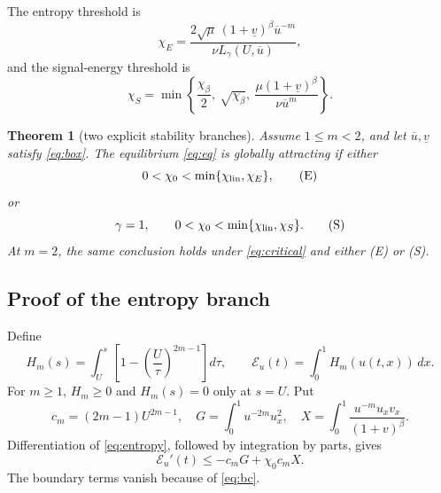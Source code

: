 \documentclass[11pt]{article}
\newtheorem{theorem}{Theorem}
\begin{document}
The entropy threshold is
\begin{equation}
 \chi_E=
 \frac{2\sqrt\mu\,(1+\underline v)^\beta\overline u^{-m}}
 {\nu L_\gamma(U,\overline u)},                        \label{eq:chiE}
\end{equation}
and the signal-energy threshold is
\begin{equation}
 \chi_S=
 \min\left\{
 \frac{\chi_\beta}{2},\
 \sqrt{\chi_\beta},\
 \frac{\mu(1+\underline v)^\beta}
 {\nu\overline u^m}
 \right\}.                                             \label{eq:chiS}
\end{equation}

\begin{theorem}[two explicit stability branches]
Assume \(1\le m<2\), and let \(\overline u,\underline v\) satisfy
\eqref{eq:box}.  The equilibrium \eqref{eq:eq} is globally attracting if
either
\begin{equation*}
 0<\chi_0<\min\{\chi_{\rm lin},\chi_E\},                \tag{E}
\end{equation*}
or
\begin{equation*}
 \gamma=1,\qquad
 0<\chi_0<\min\{\chi_{\rm lin},\chi_S\}.                \tag{S}
\end{equation*}
At \(m=2\), the same conclusion holds under
\eqref{eq:critical} and either \emph{(E)} or \emph{(S)}.
\end{theorem}

\subsection{Proof of the entropy branch}

Define
\begin{equation}
 H_m(s)=\int_U^s
 \left[1-\left(\frac{U}{\tau}\right)^{2m-1}\right]d\tau,
 \qquad
 \mathcal E_u(t)=\int_0^1H_m(u(t,x))\,dx.               \label{eq:entropy}
\end{equation}
For \(m\ge1\), \(H_m\ge0\) and \(H_m(s)=0\) only at \(s=U\).
Put
\[
 c_m=(2m-1)U^{2m-1},
\quad
 G=\int_0^1u^{-2m}u_x^2,
\quad
 X=\int_0^1\frac{u^{-m}u_xv_x}{(1+v)^\beta}.
\]
Differentiation of \eqref{eq:entropy}, followed by integration by parts,
gives
\begin{equation}
 \mathcal E_u'(t)\le-c_mG+\chi_0c_mX.                  \label{eq:Eslope}
\end{equation}
The boundary terms vanish because of \eqref{eq:bc}.
\end{document}

